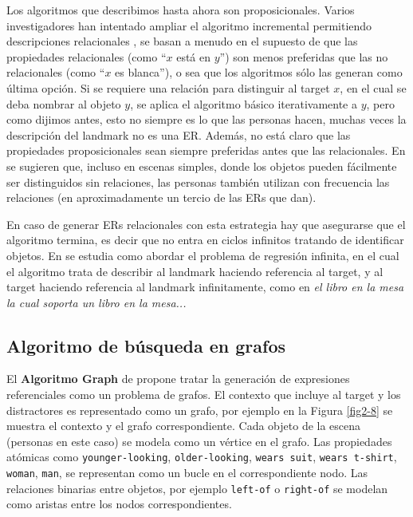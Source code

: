 Los algoritmos que describimos hasta ahora son proposicionales. Varios investigadores han intentado ampliar el algoritmo incremental permitiendo descripciones relacionales
\cite{Horacek1997,krahmer,kelleher06:increm}, se basan a menudo
en el supuesto de que las propiedades relacionales (como ``$x$ est\'a en $y$'') son menos preferidas que
las no relacionales (como ``$x$ es blanca''), o sea que los algoritmos s\'olo las generan como \'ultima opci\'on. Si se requiere una relaci\'on para distinguir al target
$x$, en el cual se deba nombrar al objeto $y$, se aplica el algoritmo b\'asico iterativamente a $y$, pero como dijimos antes, esto no siempre es lo que las personas hacen, muchas veces la descripci\'on del landmark no es una ER. Adem\'as, no est\'a claro que las propiedades proposicionales sean siempre preferidas antes que las relacionales. En \cite{viet:gene11} se sugieren que, incluso en escenas simples, donde los objetos pueden f\'acilmente ser distinguidos
sin relaciones, las personas tambi\'en utilizan con frecuencia las relaciones (en aproximadamente un tercio de las ERs que dan).

En caso de generar ERs relacionales con esta estrategia hay que asegurarse que el algoritmo termina, es decir que no entra en ciclos infinitos 
tratando de identificar objetos. En \cite{haddock} se estudia como abordar el problema de regresi\'on infinita, en el cual el algoritmo trata de describir al landmark haciendo referencia al target, y al target haciendo referencia al landmark infinitamente, como en {\it el libro en la mesa la cual soporta un libro en la mesa... }


\subsection{Algoritmo de b\'usqueda en grafos}
\label{graph}

%


El {\bf Algoritmo Graph} de \cite{graph} propone tratar la generaci\'on de expresiones referenciales como un problema de grafos. El contexto que incluye al target y los distractores es representado como un grafo, por ejemplo en la Figura \ref{fig2-8} se muestra el contexto y el grafo correspondiente. Cada objeto de la escena (personas en este caso) se modela como un v\'ertice en el grafo. Las propiedades at\'omicas como \texttt{younger-looking}, \texttt{older-looking}, \texttt{wears suit}, \texttt{wears t-shirt}, \texttt{woman}, \texttt{man}, se representan como un bucle en el correspondiente nodo. Las relaciones binarias entre objetos, por ejemplo \texttt{left-of} o \texttt{right-of} se modelan como aristas entre los nodos correspondientes.

